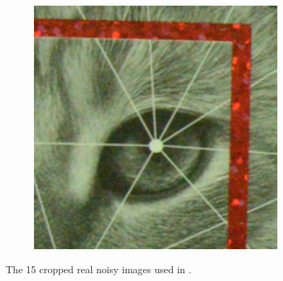 \begin{figure}
\begin{subfigure}[t]{0.19\textwidth}
    \end{subfigure}
    \hfill
    \begin{subfigure}[t]{0.19\textwidth}
        \centering
        \includegraphics[width=1\textwidth]{images/mcwnnm/resize_d800_iso6400_3_real.png}
    \end{subfigure}
    \caption{The 15 cropped real noisy images used in \cite{crosschannel2016}.}
    \label{fig3-4}
\end{figure}

